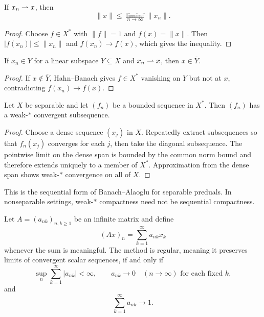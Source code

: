 \begin{notetheorem}
If $x_n\rightharpoonup x$, then
\[
  \|x\|\le\liminf_{n\to\infty}\|x_n\|.
\]
\end{notetheorem}

\begin{proof}
Choose $f\in X^*$ with $\|f\|=1$ and $f(x)=\|x\|$.  Then
$|f(x_n)|\le\|x_n\|$ and $f(x_n)\to f(x)$, which gives the inequality.
\end{proof}

\begin{noteexercise}
If $x_n\in Y$ for a linear subspace $Y\subseteq X$ and $x_n\rightharpoonup x$, then
$x\in\overline Y$.
\end{noteexercise}

\begin{proof}
If $x\notin\overline Y$, Hahn--Banach gives $f\in X^*$ vanishing on $Y$ but
not at $x$, contradicting $f(x_n)\to f(x)$.
\end{proof}

\begin{notetheorem}
Let $X$ be separable and let $(f_n)$ be a bounded sequence in $X^*$.  Then
$(f_n)$ has a weak-$*$ convergent subsequence.
\end{notetheorem}

\begin{proof}
Choose a dense sequence $(x_j)$ in $X$.  Repeatedly extract subsequences so
that $f_n(x_j)$ converges for each $j$, then take the diagonal subsequence.
The pointwise limit on the dense span is bounded by the common norm bound and
therefore extends uniquely to a member of $X^*$.  Approximation from the dense
span shows weak-$*$ convergence on all of $X$.
\end{proof}

\begin{noteremark}
This is the sequential form of Banach--Alaoglu for separable preduals.  In
nonseparable settings, weak-$*$ compactness need not be sequential compactness.
\end{noteremark}

\begin{notetheorem}
Let $A=(a_{nk})_{n,k\ge1}$ be an infinite matrix and define
\[
  (Ax)_n=\sum_{k=1}^{\infty}a_{nk}x_k
\]
whenever the sum is meaningful.  The method is regular, meaning it preserves
limits of convergent scalar sequences, if and only if
\[
  \sup_n\sum_{k=1}^{\infty}|a_{nk}|<\infty,
  \qquad
  a_{nk}\longrightarrow0\quad(n\to\infty)\text{ for each fixed }k,
\]
and
\[
  \sum_{k=1}^{\infty}a_{nk}\longrightarrow1.
\]
\end{notetheorem}

